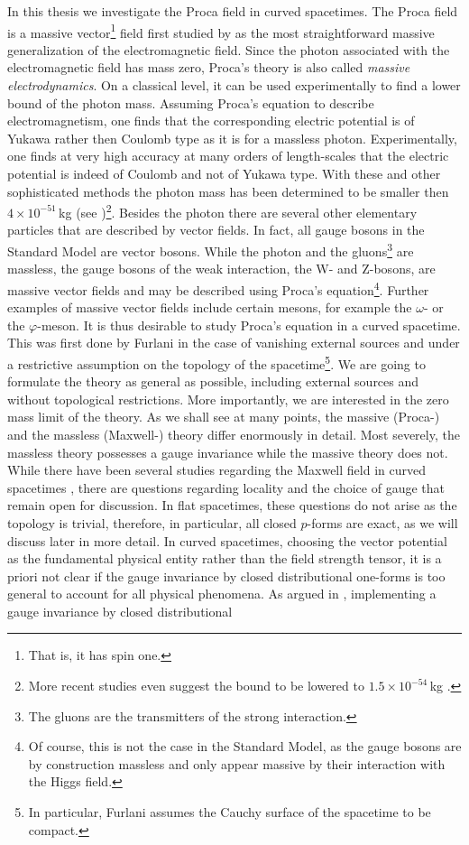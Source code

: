 %
In this thesis we investigate the Proca field in curved spacetimes. The Proca field is a massive vector\footnote{That is, it has spin one.} field first studied by  \cite{proca_original} as the most straightforward massive generalization of the electromagnetic field. Since the photon associated with the electromagnetic field has mass zero, Proca's theory is also called \emph{massive electrodynamics}. On a classical level, it can be used experimentally to find a lower bound of the photon mass. Assuming Proca's equation to describe electromagnetism, one finds that the corresponding electric potential is of Yukawa rather then Coulomb type as it is for a massless photon. Experimentally, one finds at very high accuracy at many orders of length-scales that the electric potential is indeed of Coulomb and not of Yukawa type. With these and other sophisticated methods the photon mass has been determined to be smaller then $4 \times 10^{-51}$\,kg (see \cite[Section I.2]{jackson})\footnote{More recent studies even suggest the bound to be lowered to $1.5 \times 10^{-54}$\,kg \cite{photon_mass}.}. Besides the photon there are several other elementary particles that are described by vector fields. In fact, all gauge bosons in the Standard Model are vector bosons. While the photon and the gluons\footnote{The gluons are the transmitters of the strong interaction.} are massless, the gauge bosons of the weak interaction, the W- and Z-bosons, are massive vector fields and may be described using Proca's equation\footnote{Of course, this is not the case in the Standard Model, as the gauge bosons are by construction massless and only appear massive by their interaction with the Higgs field.}. Further examples of massive vector fields include certain mesons, for example the $\omega$- or the $\varphi$-meson. It is thus desirable to study Proca's equation in a curved spacetime. This was first done by Furlani \cite{FURLANI} in the case of vanishing external sources and under a restrictive assumption on the topology of the spacetime\footnote{In particular, Furlani assumes the Cauchy surface of the spacetime to be compact.}. We are going to formulate the theory as general as possible, including external sources and without topological restrictions. More importantly, we are interested in the zero mass limit of the theory. As we shall see at many points, the massive (Proca-) and the massless (Maxwell-) theory differ enormously in detail. Most severely, the massless theory possesses a gauge invariance while the massive theory does not. While there have been several studies regarding the Maxwell field in curved spacetimes \cite{Sanders,pfenning,dimock1992quantizedEM,Dappiaggi2012}, there are questions regarding locality and the choice of gauge that remain open for discussion. In flat spacetimes, these questions do not arise as the topology is trivial, therefore, in particular, all closed $p$-forms are exact, as we will discuss later in more detail. In curved spacetimes, choosing the vector potential as the fundamental physical entity rather than the field strength tensor, it is a priori not clear if the gauge invariance by closed distributional one-forms is too general to account for all physical phenomena. As argued in \cite{Sanders}, implementing a gauge invariance by closed distributional 